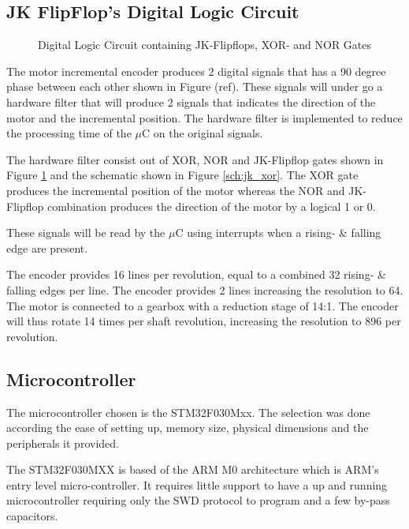 \documentclass[a4paper,12pt]{article}
\begin{document}
	\subsection{JK FlipFlop's Digital Logic Circuit}
	
	\begin{figure}[h]
		\centering
		
		\caption{Digital Logic Circuit containing JK-Flipflops, XOR- and NOR Gates}
		\label{fig:jk_xor}
	\end{figure}
	
	The motor incremental encoder produces 2 digital signals  that has a 90 degree phase between each other shown in Figure (ref). These signals will under go a hardware filter that will produce 2 signals that indicates the direction of the motor and the incremental position. The hardware filter is implemented to reduce the processing time of the $\mu$C on the original signals.
	
	The hardware filter consist out of XOR, NOR and JK-Flipflop gates shown in Figure \ref{fig:jk_xor} and the schematic shown in Figure \ref{sch:jk_xor}. The XOR gate produces the incremental position of the motor whereas the NOR and JK-Flipflop combination produces the direction of the motor by a logical 1 or 0.
	
	
	
	
	
	 These signals will be read by the $\mu$C using interrupts when a rising- \& falling edge are present.
	 
	 The encoder provides 16 lines per revolution, equal to a combined 32 rising- \& falling edges per line. The encoder provides 2 lines increasing the resolution to 64. The motor is connected to a gearbox with a reduction stage of 14:1. The encoder will thus rotate 14 times per shaft revolution, increasing the resolution to 896 per revolution.
	
	\subsection{Microcontroller}
	The microcontroller chosen is the STM32F030Mxx. The selection was done according the ease of setting up, memory size, physical dimensions and the peripherals it provided.
	
	The STM32F030MXX is based of the ARM M0 architecture which is ARM's entry level micro-controller. It requires little support to have a up and running microcontroller requiring only the SWD protocol to program and a few by-pass capacitors.
	
\end{document}
